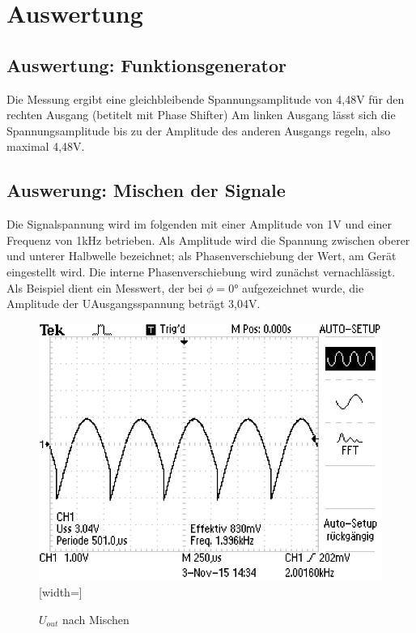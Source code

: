 \section{Auswertung}
\label{sec:Auswertung}

\subsection{Auswertung: Funktionsgenerator}
Die Messung ergibt eine gleichbleibende Spannungsamplitude von 4,48V für den
rechten Ausgang (betitelt mit Phase Shifter)
Am linken Ausgang lässt sich die Spannungsamplitude bis zu der Amplitude des
anderen Ausgangs regeln, also maximal 4,48V.

\subsection{Auswerung: Mischen der Signale}

Die Signalspannung wird im folgenden mit einer Amplitude von 1V und einer
Frequenz von 1kHz betrieben. Als Amplitude wird die Spannung zwischen
oberer und unterer Halbwelle bezeichnet; als Phasenverschiebung der Wert, am
Gerät eingestellt wird. Die interne Phasenverschiebung wird zunächst
vernachlässigt. Als Beispiel dient ein Messwert, der bei $\phi = 0°$
aufgezeichnet wurde, die Amplitude der UAusgangsspannung beträgt 3,04V.
\begin{figure}
  \centering
  \includegraphics{graphics/ALL0031/F0031TEK.jpg}[width=\textwidth]
  \caption{$U_{out}$ nach Mischen}
  \label{fig:2/phi0}
\end{figure}

